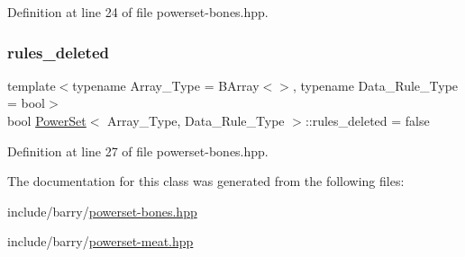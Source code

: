 Definition at line 24 of file powerset-\/bones.\+hpp.

\mbox{\label{class_power_set_a08b6baf1e244e023d997ddaecbc2116f}} 
\subsubsection{\texorpdfstring{rules\+\_\+deleted}{rules\_deleted}}
{\footnotesize\ttfamily template$<$typename Array\+\_\+\+Type  = B\+Array$<$$>$, typename Data\+\_\+\+Rule\+\_\+\+Type  = bool$>$ \\
bool \hyperlink{class_power_set}{Power\+Set}$<$ Array\+\_\+\+Type, Data\+\_\+\+Rule\+\_\+\+Type $>$\+::rules\+\_\+deleted = false}



Definition at line 27 of file powerset-\/bones.\+hpp.



The documentation for this class was generated from the following files\+:\begin{DoxyCompactItemize}
\item 
include/barry/\hyperlink{powerset-bones_8hpp}{powerset-\/bones.\+hpp}\item 
include/barry/\hyperlink{powerset-meat_8hpp}{powerset-\/meat.\+hpp}\end{DoxyCompactItemize}
